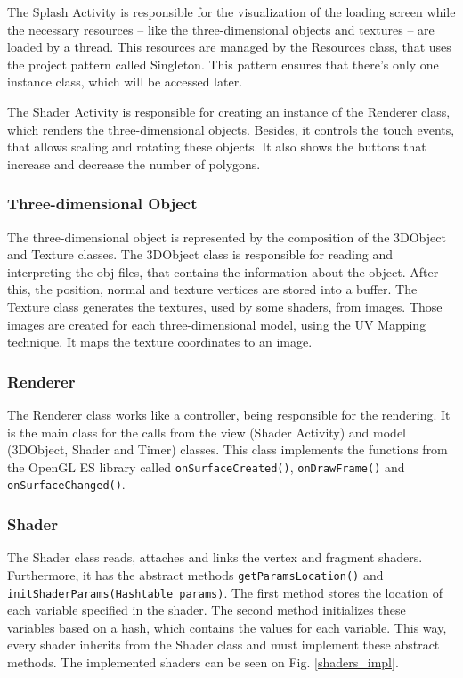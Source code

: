 \documentclass[10pt, conference, compsocconf]{IEEEtran}
\begin{document}
{ The Splash Activity is responsible for the visualization of the loading screen
while the necessary resources -- like the three-dimensional objects and textures --
are loaded by a thread. This resources are managed by the Resources class, that
uses the project pattern called Singleton. This pattern ensures that there's
only one instance class, which will be accessed later. 

 The Shader Activity is responsible for creating an instance of the Renderer 
class, which renders the three-dimensional objects. Besides, it controls the
touch events, that allows scaling and rotating these objects. It also shows
the buttons that increase and decrease the number of polygons.  

\subsubsection{Three-dimensional Object}

The three-dimensional object is represented by the composition of the 3DObject and
Texture classes. The 3DObject class is responsible for reading and interpreting the
obj files, that contains the information about the object. After this, the position, 
normal and texture vertices are stored into a buffer. The Texture class generates the textures, used by some shaders, from images.
Those images are created for each three-dimensional model, using the UV Mapping 
technique. It maps the texture coordinates to an image.

\subsubsection{Renderer}
	
The Renderer class works like a controller, being responsible for the 
rendering. It is the main class for the calls from the view (Shader Activity)
and model (3DObject, Shader and Timer) classes. This class implements the 
functions from the OpenGL ES library called \texttt{onSurfaceCreated()}, 
\texttt{onDrawFrame()} and \texttt{onSurfaceChanged()}.

\subsubsection{Shader}

The Shader class reads, attaches and links the vertex and fragment shaders.
Furthermore, it has the abstract methods \texttt{getParamsLocation()} and
\texttt{initShaderParams(Hashtable params)}. The first method stores the 
location of each variable specified in the shader. The second method initializes
these variables based on a hash, which contains the values for each variable. This way, 
every shader inherits from the Shader class and must implement these abstract methods.
The implemented shaders can be seen on Fig. \ref{shaders_impl}.

}
\end{document}
